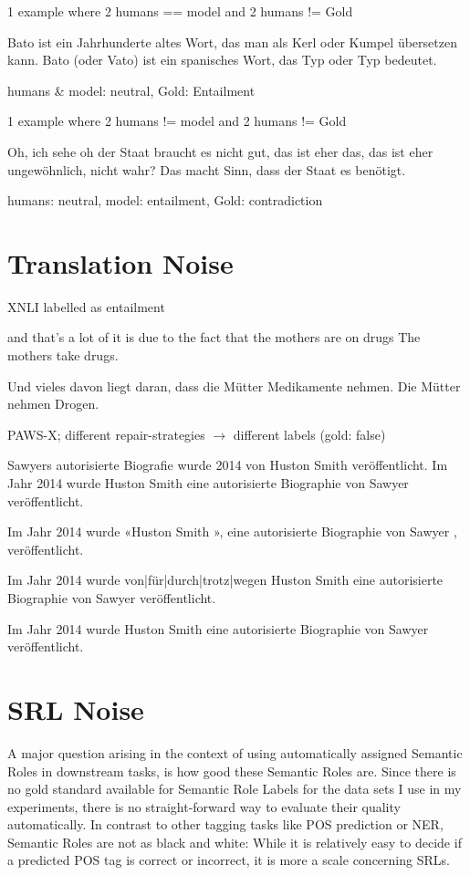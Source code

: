 1 example where 2 humans == model and 2 humans != Gold

Bato ist ein Jahrhunderte altes Wort, das man als Kerl oder Kumpel übersetzen kann.
Bato (oder Vato) ist ein spanisches Wort, das Typ oder Typ bedeutet.

humans \& model: neutral, Gold: Entailment

1 example where 2 humans != model and 2 humans != Gold

Oh, ich sehe oh der Staat braucht es nicht gut, das ist eher das, das ist eher ungewöhnlich, nicht wahr?
Das macht Sinn, dass der Staat es benötigt.

humans: neutral, model: entailment, Gold: contradiction


\section{Translation Noise}
\label{sec:translation-noise}

XNLI labelled as entailment

and that's a lot of it is due to the fact that the mothers are on drugs
The mothers take drugs.

Und vieles davon liegt daran, dass die Mütter Medikamente nehmen.
Die Mütter nehmen Drogen.

PAWS-X; different repair-strategies $\rightarrow$ different labels (gold: false)

Sawyers autorisierte Biografie wurde 2014 von Huston Smith veröffentlicht.
Im Jahr 2014 wurde Huston Smith eine autorisierte Biographie von Sawyer veröffentlicht.


Im Jahr 2014 wurde {\color{red} «}Huston Smith{\color{red} », } eine autorisierte Biographie von Sawyer{\color{red} ,} veröffentlicht.

Im Jahr 2014 wurde {\color{red} von|für|durch|trotz|wegen} Huston Smith eine autorisierte Biographie von Sawyer veröffentlicht.

Im Jahr 2014 wurde Huston Smith eine autorisierte Biographie von Sawyer veröffentlicht.


\section{SRL Noise}
\label{sec:srl-noise}

A major question arising in the context of using automatically assigned Semantic Roles in
downstream tasks, is how good these Semantic Roles are. Since there is no gold standard
available for Semantic Role Labels for the data sets I use in my experiments, there is no
straight-forward way to evaluate their quality {\color{red} automatically}. In contrast to
other tagging tasks like POS prediction or NER, Semantic Roles are not as black and white:
While it is relatively easy to decide if a predicted POS tag is correct or incorrect, it
is more a scale concerning SRLs.

